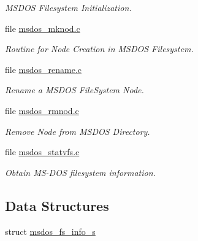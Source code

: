 \begin{DoxyCompactItemize}
\begin{DoxyCompactList}\small\item\em M\+S\+D\+OS Filesystem Initialization. \end{DoxyCompactList}\item 
file \mbox{\hyperlink{msdos__mknod_8c}{msdos\+\_\+mknod.\+c}}
\begin{DoxyCompactList}\small\item\em Routine for Node Creation in M\+S\+D\+OS Filesystem. \end{DoxyCompactList}\item 
file \mbox{\hyperlink{msdos__rename_8c}{msdos\+\_\+rename.\+c}}
\begin{DoxyCompactList}\small\item\em Rename a M\+S\+D\+OS File\+System Node. \end{DoxyCompactList}\item 
file \mbox{\hyperlink{msdos__rmnod_8c}{msdos\+\_\+rmnod.\+c}}
\begin{DoxyCompactList}\small\item\em Remove Node from M\+S\+D\+OS Directory. \end{DoxyCompactList}\item 
file \mbox{\hyperlink{msdos__statvfs_8c}{msdos\+\_\+statvfs.\+c}}
\begin{DoxyCompactList}\small\item\em Obtain M\+S-\/\+D\+OS filesystem information. \end{DoxyCompactList}\end{DoxyCompactItemize}
\subsection*{Data Structures}
\begin{DoxyCompactItemize}
\item 
struct \mbox{\hyperlink{structmsdos__fs__info__s}{msdos\+\_\+fs\+\_\+info\+\_\+s}}
\end{DoxyCompactItemize}
